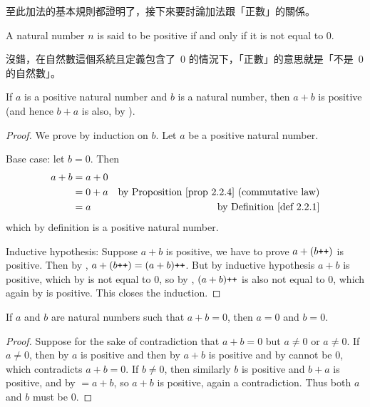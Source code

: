\begin{note}
至此加法的基本規則都證明了，接下來要討論加法跟「正數」的關係。
\end{note}

\begin{definition} \label{def 2.2.7} A natural number \(n\) is said to be positive if and only if it is not equal to \(0\).
\end{definition}
\begin{note}
沒錯，在自然數這個系統且定義包含了\ \(0\) 的情況下，「正數」的意思就是「不是\ \(0\) 的自然數」。
\end{note}

\begin{proposition}\label{prop 2.2.8} If \(a\) is a positive natural number and \(b\) is a natural number, then \(a + b\) is positive (and hence \(b + a\) is also, by ).
\end{proposition}

\begin{proof}
We prove by induction on \(b\). Let \(a\) be a positive natural number.

Base case: let \(b = 0\). Then
\begin{align*}
a + b & = a + 0 & \\
      & = 0 + a & \text{by \PROP{2.2.4} (commutative law)} \\
      & = a     & \text{by \DEF{2.2.1}}
\end{align*}
which by definition is a positive natural number.

Inductive hypothesis: Suppose \(a + b\) is positive, we have to prove \(a + (b\texttt{++})\) is positive. Then by , \(a + (b\texttt{++}) = (a + b)\texttt{++}\). But by inductive hypothesis \(a + b\) is positive, which by  is not equal to \(0\), so by , \((a + b)\texttt{++}\) is also not equal to \(0\), which again by  is positive. This closes the induction.
\end{proof}

\begin{corollary} \label{corollary 2.2.9}
If \(a\) and \(b\) are natural numbers such that \(a + b = 0\), then \(a = 0\) and \(b = 0\).
\end{corollary}

\begin{proof}
Suppose for the sake of contradiction that \(a + b = 0\) but \(a \neq 0\) or \(a \neq 0\). If \(a \neq 0\), then by  \(a\) is positive and then by  \(a + b\) is positive and by  cannot be \(0\), which contradicts \(a + b = 0\). If \(b \neq 0\), then similarly \(b\) is positive and \(b + a\) is positive, and by  \(= a + b\), so \(a + b\) is positive, again a contradiction. Thus both \(a\) and \(b\) must be \(0\).
\end{proof}

